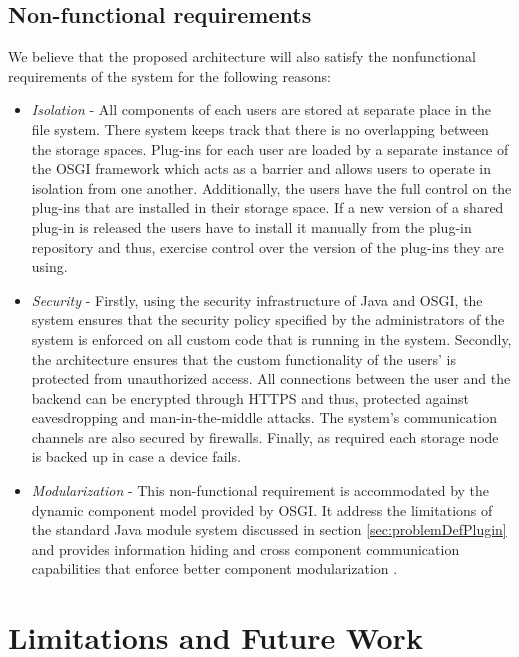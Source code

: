 \subsection{Non-functional requirements}

We believe that the proposed architecture will also satisfy the nonfunctional requirements of the system for the following reasons:

\begin{itemize}

\item \textit{Isolation} - All components of each users are stored at separate place in the file system. There system keeps track that there is no overlapping between the storage spaces. Plug-ins for each user are loaded by a separate instance of the OSGI framework which acts as a barrier and allows users to operate in isolation from one another. Additionally, the users have the full control on the plug-ins that are installed in their storage space. If a new version of a shared plug-in is released the users have to install it manually from the plug-in repository and thus, exercise control over the version of the plug-ins they are using. 


\item \textit{Security} - Firstly, using the security infrastructure of Java and OSGI, the system ensures that the security policy specified by the administrators of the system is enforced on all custom code that is running in the system. Secondly, the architecture ensures that the custom functionality of the users' is protected from unauthorized access. All connections between the user and the backend can be encrypted through HTTPS and thus, protected against eavesdropping and man-in-the-middle attacks. The system's communication channels are also secured by firewalls. Finally, as required each storage node is backed up in case a device fails.

\item \textit{Modularization} - This non-functional requirement is accommodated by the dynamic component model provided by OSGI. It address the limitations of the standard Java module system discussed in section \ref{sec:problemDefPlugin} and provides information hiding and cross component communication capabilities that enforce better component modularization \cite{Andre}.

\end{itemize}


\section{Limitations and Future Work}
\label{sec:limitsPlugin}


